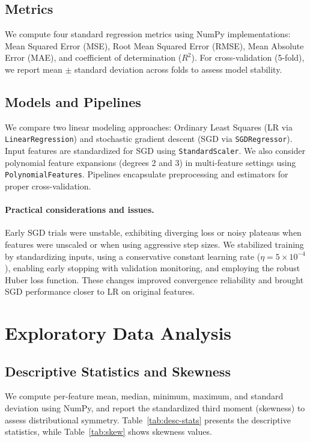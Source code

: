 \documentclass[runningheads]{llncs}
\begin{document}
\subsection{Metrics}
We compute four standard regression metrics using NumPy implementations: Mean Squared Error (MSE), Root Mean Squared Error (RMSE), Mean Absolute Error (MAE), and coefficient of determination ($R^2$). For cross-validation (5-fold), we report mean $\pm$ standard deviation across folds to assess model stability.

\subsection{Models and Pipelines}
We compare two linear modeling approaches: Ordinary Least Squares (LR via \texttt{LinearRegression}) and stochastic gradient descent (SGD via \texttt{SGDRegressor}). Input features are standardized for SGD using \texttt{StandardScaler}. We also consider polynomial feature expansions (degrees 2 and 3) in multi-feature settings using \texttt{PolynomialFeatures}. Pipelines encapsulate preprocessing and estimators for proper cross-validation.

\paragraph{Practical considerations and issues.}
Early SGD trials were unstable, exhibiting diverging loss or noisy plateaus when features were unscaled or when using aggressive step sizes. We stabilized training by standardizing inputs, using a conservative constant learning rate ($\eta = 5 \times 10^{-4}$), enabling early stopping with validation monitoring, and employing the robust Huber loss function. These changes improved convergence reliability and brought SGD performance closer to LR on original features.

\section{Exploratory Data Analysis}

\subsection{Descriptive Statistics and Skewness}
We compute per-feature mean, median, minimum, maximum, and standard deviation using NumPy, and report the standardized third moment (skewness) to assess distributional symmetry. Table~\ref{tab:desc-stats} presents the descriptive statistics, while Table~\ref{tab:skew} shows skewness values.
\end{document}
